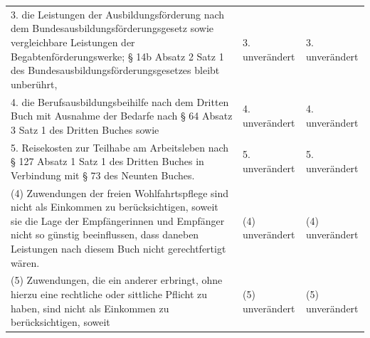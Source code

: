 \documentclass[10pt,a4paper,landscape]{article}
\begin{document}
\begin{longtable}{|L{8.2cm}|L{8.2cm}|L{8.2cm}|}
\hhline{|---|}
3.   \newline die Leistungen der Ausbildungsförderung  \newline nach dem  \newline Bundesausbildungsförderungsgesetz sowie  \newline vergleichbare Leistungen der  \newline Begabtenförderungswerke; \S{} 14b Absatz 2  \newline Satz 1 des  \newline Bundesausbildungsförderungsgesetzes  \newline bleibt unberührt, & 3. unverändert & 3. unverändert \\
\hhline{|---|}
4.   \newline die Berufsausbildungsbeihilfe nach dem  \newline Dritten Buch mit Ausnahme der Bedarfe  \newline nach \S{} 64 Absatz 3 Satz 1 des Dritten  \newline Buches sowie & 4. unverändert & 4. unverändert \\
\hhline{|---|}
5.   \newline Reisekosten zur Teilhabe am Arbeitsleben  \newline nach \S{} 127 Absatz 1 Satz 1 des Dritten  \newline Buches in Verbindung mit \S{} 73 des  \newline Neunten Buches. & 5. unverändert & 5. unverändert \\
\hhline{|---|}
(4) Zuwendungen der freien  \newline Wohlfahrtspflege sind nicht als Einkommen  \newline zu berücksichtigen, soweit sie die Lage der  \newline Empfängerinnen und Empfänger nicht so  \newline günstig beeinflussen, dass daneben  \newline Leistungen nach diesem Buch nicht  \newline gerechtfertigt wären. & (4) unverändert & (4) unverändert \\
\hhline{|---|}
(5) Zuwendungen, die ein anderer erbringt,  \newline ohne hierzu eine rechtliche oder sittliche  \newline Pflicht zu haben, sind nicht als Einkommen  \newline zu berücksichtigen, soweit & (5) unverändert & (5) unverändert \\

\end{longtable}
\end{document}
